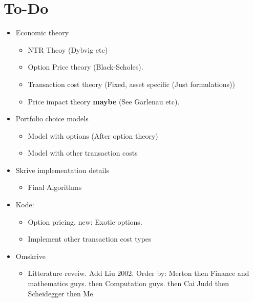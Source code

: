 \documentclass[11pt]{article}
\begin{document}
\section{To-Do}\label{sec:To-Do}
\begin{itemize}
  \item Economic theory
      \begin{itemize}
        \item NTR Theoy (Dybvig etc)
        \item Option Price theory (Black-Scholes). 
        \item Transaction cost theory (Fixed, asset specific (Just formulations))
        \item Price impact theory \textbf{maybe} (See Garlenau etc).
      \end{itemize}
  \item Portfolio choice models
      \begin{itemize}
        \item Model with options (After option theory)
        \item Model with other transaction costs
      \end{itemize}
  \item Skrive implementation details
      \begin{itemize}
        \item Final Algorithms 
      \end{itemize}
  \item Kode:
    \begin{itemize}
      \item Option pricing, new: Exotic options.
      \item Implement other transaction cost types
  \end{itemize}
  \item Omskrive
  \begin{itemize}
    \item Litterature reveiw. Add Liu 2002. Order by: Merton then Finance and mathematics guys. then Computation guys. then Cai Judd then Scheidegger then Me.
\end{itemize}
\end{itemize}





% 


\newpage

\begingroup 
  \hypersetup{linkcolor=black}

  \hypersetup{
    colorlinks=true,
    citecolor=black,
    linkcolor=black,
    filecolor=black, 
    urlcolor=black}
  \printbibliography
\endgroup

\newpage


\end{document}
